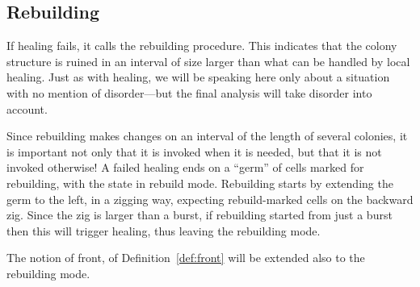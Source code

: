 \documentclass[11pt]{memoir}
\theoremstyle{definition} %
\begin{document}
\subsection{Rebuilding}\label{sec:rebuilding}

If healing fails, it calls the rebuilding procedure.
This indicates that the colony structure is ruined in an interval of size larger than 
what can be handled by local healing.
Just as with healing, we will be speaking here only about a situation with no 
mention of disorder---but the final analysis will take disorder into account.

Since rebuilding makes changes on an interval of the length of several colonies,
it is important not only that it is invoked when it is needed, but that it is not
invoked otherwise!
A failed healing ends on a ``germ'' of cells marked for rebuilding,
with the state in rebuild mode.
Rebuilding starts by extending the germ to the left, in a zigging way,
expecting rebuild-marked cells on the backward zig.
Since the zig is larger than a burst, if rebuilding started from just a burst then this
will trigger healing, thus leaving the rebuilding mode.

The notion of front, of Definition~\ref{def:front} will be extended also to the rebuilding mode.
\end{document}
